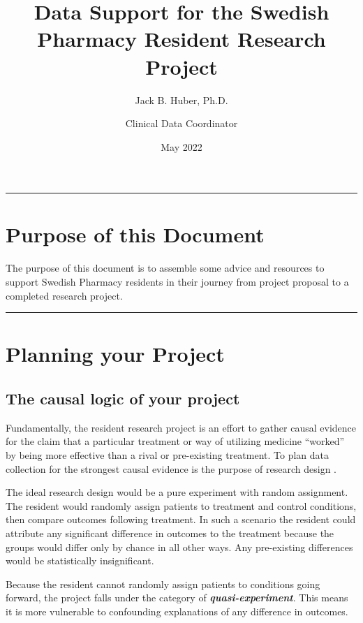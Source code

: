 \documentclass[
]{report}
\title{Data Support for the Swedish Pharmacy Resident Research Project}
\author{Jack B. Huber, Ph.D. \and Clinical Data Coordinator}
\date{May 2022}
\begin{document}
\maketitle

\begin{center}\rule{0.5\linewidth}{0.5pt}\end{center}

\hypertarget{purpose-of-this-document}{%
\chapter{Purpose of this Document}\label{purpose-of-this-document}}

The purpose of this document is to assemble some advice and resources to
support Swedish Pharmacy residents in their journey from project
proposal to a completed research project.

\begin{center}\rule{0.5\linewidth}{0.5pt}\end{center}

\hypertarget{planning-your-project}{%
\chapter{Planning your Project}\label{planning-your-project}}

\hypertarget{the-causal-logic-of-your-project}{%
\section{The causal logic of your
project}\label{the-causal-logic-of-your-project}}

Fundamentally, the resident research project is an effort to gather
causal evidence for the claim that a particular treatment or way of
utilizing medicine ``worked'' by being more effective than a rival or
pre-existing treatment. To plan data collection for the strongest causal
evidence is the purpose of research design \citep{CampbellStanley1963}.

The ideal research design would be a pure experiment with random
assignment. The resident would randomly assign patients to treatment and
control conditions, then compare outcomes following treatment. In such a
scenario the resident could attribute any significant difference in
outcomes to the treatment because the groups would differ only by chance
in all other ways. Any pre-existing differences would be statistically
insignificant.

Because the resident cannot randomly assign patients to conditions going
forward, the project falls under the category of
\emph{\textbf{quasi-experiment}}. This means it is more vulnerable to
confounding explanations of any difference in outcomes.
\end{document}
